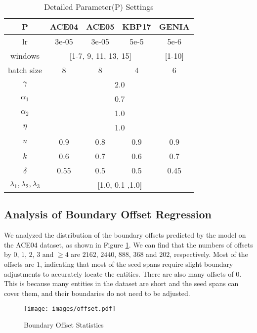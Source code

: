 \documentclass[11pt,a4paper]{article}
\begin{document}
\begin{table}[!t]
\small
\centering
\begingroup
\renewcommand{\arraystretch}{1.4} \begin{tabular}{c|c|c|c|c}
\toprule
\textbf{P}  & \textbf{ACE04}& \textbf{ACE05}& \textbf{KBP17}& \textbf{GENIA} \\
\midrule
lr & 3e-05 & 3e-05 & 5e-5 & 5e-6 \\
\hline
windows &  \multicolumn{3}{c|}{[1-7, 9, 11, 13, 15]} & [1-10] \\
\hline
batch size & 8 & 8 & 4 & 6 \\
\hline
$\gamma$& \multicolumn{4}{c}{2.0} \\
\hline
$\alpha_1$& \multicolumn{4}{c}{0.7} \\
\hline
$\alpha_2$& \multicolumn{4}{c}{1.0} \\
\hline
$\eta$& \multicolumn{4}{c}{1.0} \\
\hline
$u$& 0.9 & 0.8 & 0.9 &0.9  \\
\hline
$k$& 0.6 & 0.7 & 0.6 & 0.7  \\
\hline
$\delta$& 0.55 & 0.5 & 0.5 & 0.45\\
\hline
$\lambda_1, \lambda_2, \lambda_3$ & \multicolumn{4}{c}{[1.0, 0.1 ,1.0]}\\
\bottomrule
\end{tabular}
\endgroup
\caption{Detailed Parameter(P) Settings}
\label{tab:hp}
\end{table}



\subsection{Analysis of Boundary Offset Regression}

We analyzed the distribution of the boundary offsets predicted by the model on the ACE04 dataset, as shown in Figure \ref{fig:offset}. We can find that the numbers of offsets by $0$, $1$, $2$, $3$ and $\geq4$  are $2162$, $2440$, $888$, $368$ and $202$, respectively. Most of the offsets are $1$, indicating that most of the seed spans require slight boundary adjustments to accurately locate the entities. There are also many offsets of $0$. This is because many entities in the dataset are short and the seed spans can cover them, and their boundaries do not need to be adjusted.

\begin{figure}[h]
  \centering
  \texttt{[image: images/offset.pdf]}
  \caption{Boundary Offset Statistics}
  \label{fig:offset}
\end{figure}
\end{document}

